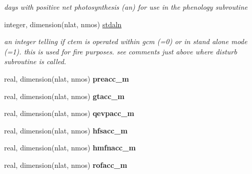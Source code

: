 \begin{DoxyCompactItemize}
\begin{DoxyCompactList}\small\item\em days with positive net photosynthesis (an) for use in the phenology subroutine \end{DoxyCompactList}\item 
\hypertarget{structctem__statevars_1_1veg__rot_a359ff9e01cf362c01a263412a2ab751f}{}integer, dimension(nlat, nmos) \hyperlink{structctem__statevars_1_1veg__rot_a359ff9e01cf362c01a263412a2ab751f}{stdaln}\label{structctem__statevars_1_1veg__rot_a359ff9e01cf362c01a263412a2ab751f}

\begin{DoxyCompactList}\small\item\em an integer telling if ctem is operated within gcm (=0) or in stand alone mode (=1). this is used for fire purposes. see comments just above where disturb subroutine is called. \end{DoxyCompactList}\item 
\hypertarget{structctem__statevars_1_1veg__rot_a039c659636b161402ef54678b4b8c769}{}real, dimension(nlat, nmos) {\bfseries preacc\+\_\+m}\label{structctem__statevars_1_1veg__rot_a039c659636b161402ef54678b4b8c769}

\item 
\hypertarget{structctem__statevars_1_1veg__rot_a0c32bb166b773d24dde52c00015e69d4}{}real, dimension(nlat, nmos) {\bfseries gtacc\+\_\+m}\label{structctem__statevars_1_1veg__rot_a0c32bb166b773d24dde52c00015e69d4}

\item 
\hypertarget{structctem__statevars_1_1veg__rot_a7860857f151f14425d77eec9f88cefa9}{}real, dimension(nlat, nmos) {\bfseries qevpacc\+\_\+m}\label{structctem__statevars_1_1veg__rot_a7860857f151f14425d77eec9f88cefa9}

\item 
\hypertarget{structctem__statevars_1_1veg__rot_a84bcf22e1126471f5377c043d5f269bf}{}real, dimension(nlat, nmos) {\bfseries hfsacc\+\_\+m}\label{structctem__statevars_1_1veg__rot_a84bcf22e1126471f5377c043d5f269bf}

\item 
\hypertarget{structctem__statevars_1_1veg__rot_a309f1b8ef443a56cc438c4a1f92ade2e}{}real, dimension(nlat, nmos) {\bfseries hmfnacc\+\_\+m}\label{structctem__statevars_1_1veg__rot_a309f1b8ef443a56cc438c4a1f92ade2e}

\item 
\hypertarget{structctem__statevars_1_1veg__rot_a48a5cdad16717b467ed79599d2b406ba}{}real, dimension(nlat, nmos) {\bfseries rofacc\+\_\+m}\label{structctem__statevars_1_1veg__rot_a48a5cdad16717b467ed79599d2b406ba}


\end{DoxyCompactItemize}
